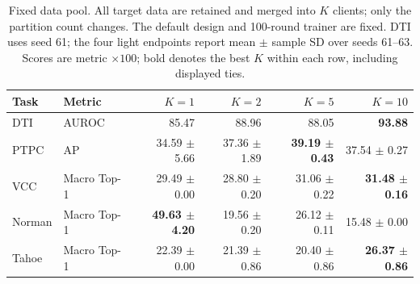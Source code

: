 \begin{table}[htbp]
\caption{Fixed data pool. All target data are retained and merged into $K$ clients; only the partition count changes. The default design and 100-round trainer are fixed. DTI uses seed 61; the four light endpoints report mean $\pm$ sample SD over seeds 61--63. Scores are metric $\times100$; bold denotes the best $K$ within each row, including displayed ties.}
\label{tab:completed-partition}
\centering\small
\setlength{\tabcolsep}{4pt}
\begin{tabularx}{\linewidth}{@{}lXrrrr@{}}
\toprule
Task & Metric & $K=1$ & $K=2$ & $K=5$ & $K=10$ \\
\midrule
DTI & AUROC & 85.47 & 88.96 & 88.05 & \textbf{93.88} \\
PTPC & AP & 34.59 $\pm$ 5.66 & 37.36 $\pm$ 1.89 & \textbf{39.19 $\pm$ 0.43} & 37.54 $\pm$ 0.27 \\
VCC & Macro Top-1 & 29.49 $\pm$ 0.00 & 28.80 $\pm$ 0.20 & 31.06 $\pm$ 0.22 & \textbf{31.48 $\pm$ 0.16} \\
Norman & Macro Top-1 & \textbf{49.63 $\pm$ 4.20} & 19.56 $\pm$ 0.20 & 26.12 $\pm$ 0.11 & 15.48 $\pm$ 0.00 \\
Tahoe & Macro Top-1 & 22.39 $\pm$ 0.00 & 21.39 $\pm$ 0.86 & 20.40 $\pm$ 0.86 & \textbf{26.37 $\pm$ 0.86} \\
\bottomrule
\end{tabularx}
\end{table}
